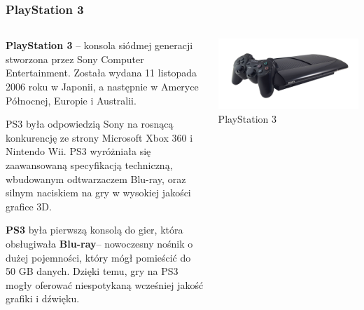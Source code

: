 \documentclass[8pt]{beamer}
\begin{document}
\begin{frame}
\frametitle{PlayStation 3}
\begin{columns}

\begin{column}{0.6\textwidth}
\textbf {PlayStation 3} – konsola siódmej generacji stworzona przez Sony Computer Entertainment. Została wydana 11 listopada 2006 roku w Japonii, a następnie w Ameryce Północnej, Europie i Australii.

\vspace{0.5em}
PS3 była odpowiedzią Sony na rosnącą konkurencję ze strony Microsoft Xbox 360 i Nintendo Wii. PS3 wyróżniała się zaawansowaną specyfikacją techniczną, wbudowanym odtwarzaczem Blu-ray, oraz silnym naciskiem na gry w wysokiej jakości grafice 3D.

\vspace{0.5em}
\textbf {PS3} była pierwszą konsolą do gier, która obsługiwała \textbf {Blu-ray}– nowoczesny nośnik o dużej pojemności, który mógł pomieścić do 50 GB danych. Dzięki temu, gry na PS3 mogły oferować niespotykaną wcześniej jakość grafiki i dźwięku.

\end{column}

\begin{column}{0.35\textwidth}
        \centering
        \includegraphics[width=\textwidth]{ps3.jpg} 
        {\small PlayStation 3} 
    \end{column}
\end{columns}

\end{frame}
\end{document}
